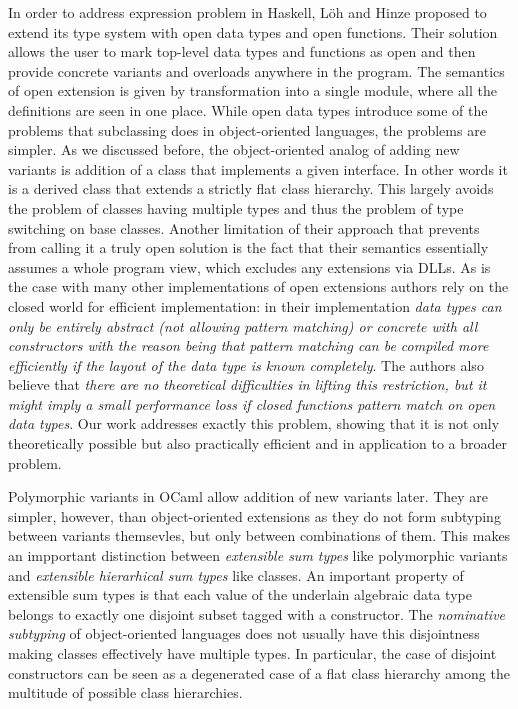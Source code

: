 \documentclass[preprint]{sigplanconf}
\begin{document}
In order to address expression problem in Haskell, L\"{o}h and Hinze proposed to 
extend its type system with open data types and open functions\cite{LohHinze2006}.
Their solution allows the user to mark top-level data types and functions as 
open and then provide concrete variants and overloads anywhere in the program. 
The semantics of open extension is given by transformation into a single module, 
where all the definitions are seen in one place. While open data types introduce 
some of the problems that subclassing does in object-oriented languages, the 
problems are simpler. As we discussed before, the object-oriented analog of 
adding new variants is addition of a class that implements a given interface. In 
other words it is a derived class that extends a strictly flat class hierarchy. 
This largely avoids the problem of classes having multiple types and thus the 
problem of type switching on base classes. Another limitation of their approach 
that prevents from calling it a truly open solution is the fact that their 
semantics essentially assumes a whole program view, which excludes any 
extensions via DLLs. As is the case with many other implementations of open 
extensions authors rely on the closed world for efficient implementation: in 
their implementation \emph{data types can only be entirely abstract (not 
allowing pattern matching) or concrete with all constructors with the reason 
being that pattern matching can be compiled more efficiently if the layout of 
the data type is known completely}. The authors also believe that \emph{there 
are no theoretical difficulties in lifting this restriction, but it might imply 
a small performance loss if closed functions pattern match on open data types}. 
Our work addresses exactly this problem, showing that it is not only 
theoretically possible but also practically efficient and in application to a 
broader problem.

Polymorphic variants in OCaml\cite{garrigue-98} allow addition of new variants 
later. They are simpler, however, than object-oriented extensions as they do not 
form subtyping between variants themsevles, but only between combinations of them. 
This makes an impportant distinction between \emph{extensible sum types} like 
polymorphic variants and \emph{extensible hierarhical sum types} like classes.
An important property of extensible sum types is that each value of the 
underlain algebraic data type belongs to exactly one disjoint subset tagged with 
a constructor. The \emph{nominative subtyping} of object-oriented languages does 
not usually have this disjointness making classes effectively have multiple 
types. In particular, the case of disjoint constructors can be seen as a 
degenerated case of a flat class hierarchy among the multitude of possible class 
hierarchies.
\end{document}
